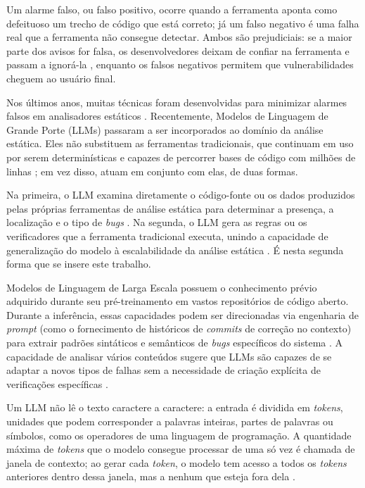 \documentclass[
    12pt,                %
    openright,           %
    oneside,             %
    a4paper,             %
    english,             %
    brazil               %
]{abntex2}
\begin{document}
\par
Um alarme falso, ou falso positivo, ocorre quando a ferramenta aponta como defeituoso um trecho de código que está correto; já um falso negativo é uma falha real que a ferramenta não consegue detectar.
Ambos são prejudiciais: se a maior parte dos avisos for falsa, os desenvolvedores deixam de confiar na ferramenta e passam a ignorá-la \cite{aho2007compilers}, enquanto os falsos negativos permitem que vulnerabilidades cheguem ao usuário final.
\par
Nos últimos anos, muitas técnicas foram desenvolvidas para minimizar alarmes falsos em analisadores estáticos \cite{jiang2025factaligned}.
Recentemente, Modelos de Linguagem de Grande Porte (LLMs) passaram a ser incorporados ao domínio da análise estática.
Eles não substituem as ferramentas tradicionais, que continuam em uso por serem determinísticas e capazes de percorrer bases de código com milhões de linhas \cite{yang2025knighter}; em vez disso, atuam em conjunto com elas, de duas formas.
\par
Na primeira, o LLM examina diretamente o código-fonte ou os dados produzidos pelas próprias ferramentas de análise estática para determinar a presença, a localização e o tipo de \textit{bugs} \cite{hou2025generation}.
Na segunda, o LLM gera as regras ou os verificadores que a ferramenta tradicional executa, unindo a capacidade de generalização do modelo à escalabilidade da análise estática \cite{hou2025generation, yang2025knighter}.
É nesta segunda forma que se insere este trabalho.
\par
Modelos de Linguagem de Larga Escala possuem o conhecimento prévio adquirido durante seu pré-treinamento em vastos repositórios de código aberto. 
Durante a inferência, essas capacidades podem ser direcionadas via engenharia de \textit{prompt} (como o fornecimento de históricos de \textit{commits} de correção no contexto) para extrair padrões sintáticos e semânticos de \textit{bugs} específicos do sistema \cite{tang2021grammar}. 
A capacidade de analisar vários conteúdos sugere que LLMs são capazes de se adaptar a novos tipos de falhas sem a necessidade de criação explícita de verificações específicas \cite{yang2025knighter}.
\par
Um LLM não lê o texto caractere a caractere: a entrada é dividida em \textit{tokens}, unidades que podem corresponder a palavras inteiras, partes de palavras ou símbolos, como os operadores de uma linguagem de programação.
A quantidade máxima de \textit{tokens} que o modelo consegue processar de uma só vez é chamada de janela de contexto; ao gerar cada \textit{token}, o modelo tem acesso a todos os \textit{tokens} anteriores dentro dessa janela, mas a nenhum que esteja fora dela \cite{jurafsky2026speech}.
\end{document}
